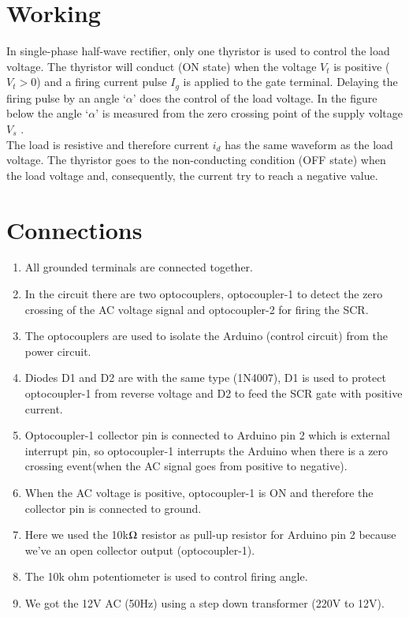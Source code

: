 \documentclass[journal,12pt,twocolumn]{IEEEtran}
\begin{document}
\section{Working}
In single-phase half-wave rectifier, only one thyristor is used to control the load voltage. The thyristor will conduct (ON state) when the voltage $V_t$ is positive ($V_t > 0$) and a firing current pulse $I_g$ is applied to the gate terminal. Delaying the firing pulse by an angle ‘$\alpha$’ does the control of the load voltage. In the figure below the angle ‘$\alpha$’ is measured from the zero crossing point of the supply voltage $V_s$ .\\
The load is resistive and therefore current $i_d$ has the same waveform as the load voltage. The thyristor goes to the non-conducting condition (OFF state) when the load voltage and, consequently, the current try to reach a negative value.



 \section{Connections}
\begin{enumerate}
\item 
All grounded terminals are connected together.\item  In the circuit there are two optocouplers, optocoupler-1 to detect the zero crossing of the AC voltage signal and optocoupler-2 for firing the SCR. 
\item The optocouplers are used to isolate the Arduino (control circuit) from the power circuit.
\item  Diodes D1 and D2 are with the same type (1N4007), D1 is used to protect optocoupler-1 from reverse voltage and D2 to feed the SCR gate with positive current.
\item Optocoupler-1 collector pin is connected to Arduino pin 2 which is external interrupt pin, so optocoupler-1 interrupts the Arduino when there is a zero crossing event(when the AC signal goes from positive to negative).
\item When the AC voltage is positive, optocoupler-1 is ON and therefore the collector pin is connected to ground.
\item Here we used the 10k$\ohm$ resistor as pull-up resistor for Arduino pin 2 because we’ve an open collector output (optocoupler-1).
\item The 10k ohm potentiometer is used to control firing angle.
\item 
We got the 12V AC (50Hz) using a step down transformer (220V to 12V).

\end{enumerate}
\end{document}
